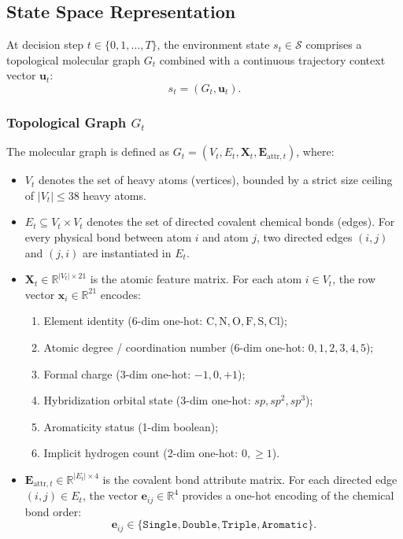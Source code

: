 \documentclass{ieeeaccess}
\begin{document}
\subsection{State Space Representation}
At decision step $t \in \{0, 1, \dots, T\}$, the environment state $s_t \in \mathcal{S}$ comprises a topological molecular graph $G_t$ combined with a continuous trajectory context vector $\mathbf{u}_t$:
\begin{equation}
s_t = \left(G_t, \mathbf{u}_t\right).
\label{eq:state_definition}
\end{equation}

\subsubsection{Topological Graph $G_t$}
The molecular graph is defined as $G_t = (V_t, E_t, \mathbf{X}_t, \mathbf{E}_{\text{attr}, t})$, where:
\begin{itemize}
    \item $V_t$ denotes the set of heavy atoms (vertices), bounded by a strict size ceiling of $|V_t| \le 38$ heavy atoms.
    \item $E_t \subseteq V_t \times V_t$ denotes the set of directed covalent chemical bonds (edges). For every physical bond between atom $i$ and atom $j$, two directed edges $(i, j)$ and $(j, i)$ are instantiated in $E_t$.
    \item $\mathbf{X}_t \in \mathbb{R}^{|V_t| \times 21}$ is the atomic feature matrix. For each atom $i \in V_t$, the row vector $\mathbf{x}_i \in \mathbb{R}^{21}$ encodes:
    \begin{enumerate}
        \item Element identity (6-dim one-hot: $\text{C}, \text{N}, \text{O}, \text{F}, \text{S}, \text{Cl}$);
        \item Atomic degree / coordination number (6-dim one-hot: $0, 1, 2, 3, 4, 5$);
        \item Formal charge (3-dim one-hot: $-1, 0, +1$);
        \item Hybridization orbital state (3-dim one-hot: $sp, sp^2, sp^3$);
        \item Aromaticity status (1-dim boolean);
        \item Implicit hydrogen count (2-dim one-hot: $0, \ge 1$).
    \end{enumerate}
    \item $\mathbf{E}_{\text{attr}, t} \in \mathbb{R}^{|E_t| \times 4}$ is the covalent bond attribute matrix. For each directed edge $(i, j) \in E_t$, the vector $\mathbf{e}_{ij} \in \mathbb{R}^4$ provides a one-hot encoding of the chemical bond order:
    \begin{equation}
    \mathbf{e}_{ij} \in \{\texttt{Single}, \texttt{Double}, \texttt{Triple}, \texttt{Aromatic}\}.
    \label{eq:bond_vector}
    \end{equation}
\end{itemize}
\end{document}
